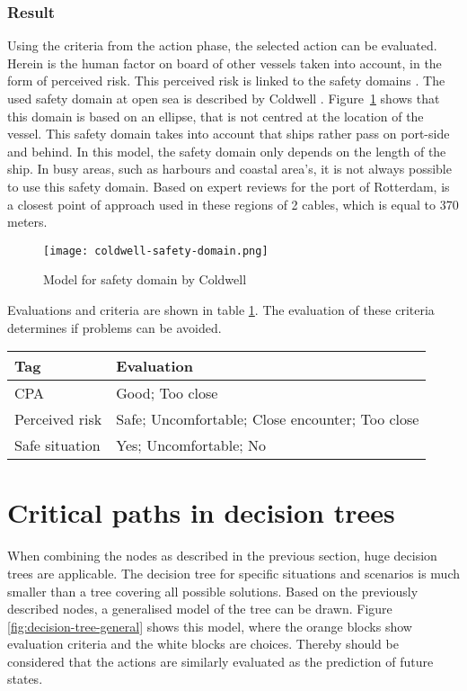 \subsubsection{Result}
Using the criteria from the action phase, the selected action can be evaluated. Herein is the human factor on board of other vessels taken into account, in the form of perceived risk. This perceived risk is linked to the safety domains \cite{Szlapczynski2017a}. The used safety domain at open sea is described by Coldwell \cite{Coldwell1983}. Figure~\ref{fig:coldwell-safety-domain} shows that this domain is based on an ellipse, that is not centred at the location of the vessel. This safety domain takes into account that ships rather pass on port-side and behind. In this model, the safety domain only depends on the length of the ship.
In busy areas, such as harbours and coastal area's, it is not always possible to use this safety domain. Based on expert reviews for the port of Rotterdam, is a closest point of approach used in these regions of 2 cables, which is equal to 370 meters.

\begin{figure}[p]
	\centering
	\texttt{[image: coldwell-safety-domain.png]}
	\caption{Model for safety domain by Coldwell}
	\label{fig:coldwell-safety-domain}
\end{figure}

Evaluations and criteria are shown in table \ref{tab:criteria-safe-situation}. The evaluation of these criteria determines if problems can be avoided.

\begin{table}[H]
	\begin{tabular}{p{}|p{}}
		\toprule
		Tag & Evaluation\\
		\midrule
		CPA & Good; Too close\\
		Perceived risk & Safe; Uncomfortable; Close encounter; Too close\\
		Safe situation & Yes; Uncomfortable; No\\
		\bottomrule
	\end{tabular}
	
	\label{tab:criteria-safe-situation}
\end{table}


\section{Critical paths in decision trees}
When combining the nodes as described in the previous section, huge decision trees are applicable. The decision tree for specific situations and scenarios is much smaller than a tree covering all possible solutions. Based on the previously described nodes, a generalised model of the tree can be drawn. Figure \ref{fig:decision-tree-general} shows this model, where the orange blocks show evaluation criteria and the white blocks are choices. Thereby should be considered that the actions are similarly evaluated as the prediction of future states.

